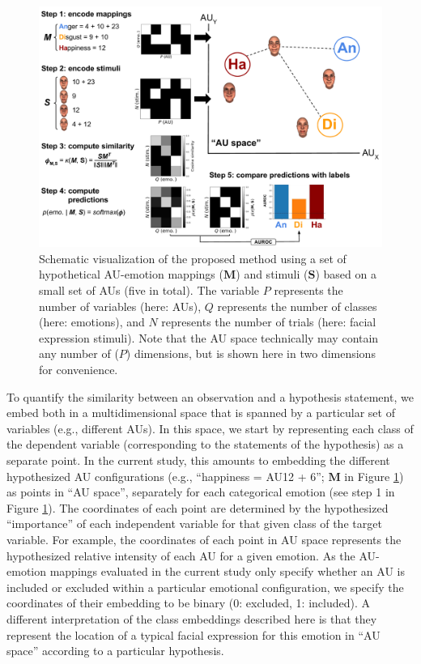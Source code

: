 \documentclass[11pt,american,a4paper,oneside,]{memoir} %
\begin{document}
\begin{figure}
\centering
\includegraphics{_bookdown_files/hypothesis-kernel-analysis-files/figures/figure_2.pdf}
\caption{\label{fig:fig-hka-2}Schematic visualization of the proposed method using a set of hypothetical AU-emotion mappings (\(\mathbf{M}\)) and stimuli (\(\mathbf{S}\)) based on a small set of AUs (five in total). The variable \(P\) represents the number of variables (here: AUs), \(Q\) represents the number of classes (here: emotions), and \(N\) represents the number of trials (here: facial expression stimuli). Note that the AU space technically may contain any number of (\(P\)) dimensions, but is shown here in two dimensions for convenience.}
\end{figure}



To quantify the similarity between an observation and a hypothesis statement, we embed both in a multidimensional space that is spanned by a particular set of variables (e.g., different AUs). In this space, we start by representing each class of the dependent variable (corresponding to the statements of the hypothesis) as a separate point. In the current study, this amounts to embedding the different hypothesized AU configurations (e.g., ``happiness = AU12 + 6''; \(\mathbf{M}\) in Figure \ref{fig:fig-hka-2}) as points in ``AU space'', separately for each categorical emotion (see step 1 in Figure \ref{fig:fig-hka-2}). The coordinates of each point are determined by the hypothesized ``importance'' of each independent variable for that given class of the target variable. For example, the coordinates of each point in AU space represents the hypothesized relative intensity of each AU for a given emotion. As the AU-emotion mappings evaluated in the current study only specify whether an AU is included or excluded within a particular emotional configuration, we specify the coordinates of their embedding to be binary (0: excluded, 1: included). A different interpretation of the class embeddings described here is that they represent the location of a typical facial expression for this emotion in ``AU space'' according to a particular hypothesis.
\end{document}
